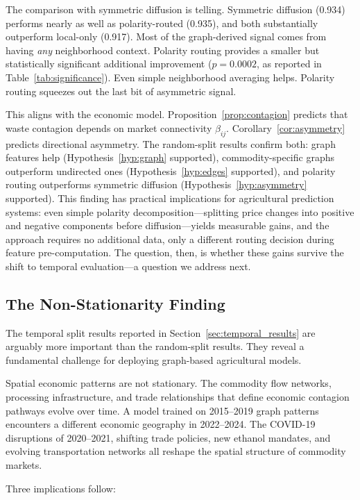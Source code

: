 \documentclass[preprint,12pt,authoryear]{elsarticle}
\begin{document}
The comparison with symmetric diffusion is telling. Symmetric diffusion (0.934) performs nearly as well as polarity-routed (0.935), and both substantially outperform local-only (0.917). Most of the graph-derived signal comes from having \emph{any} neighborhood context. Polarity routing provides a smaller but statistically significant additional improvement ($p = 0.0002$, as reported in Table~\ref{tab:significance}). Even simple neighborhood averaging helps. Polarity routing squeezes out the last bit of asymmetric signal.

This aligns with the economic model. Proposition~\ref{prop:contagion} predicts that waste contagion depends on market connectivity $\beta_{ij}$. Corollary~\ref{cor:asymmetry} predicts directional asymmetry. The random-split results confirm both: graph features help (Hypothesis~\ref{hyp:graph} supported), commodity-specific graphs outperform undirected ones (Hypothesis~\ref{hyp:edges} supported), and polarity routing outperforms symmetric diffusion (Hypothesis~\ref{hyp:asymmetry} supported). This finding has practical implications for agricultural prediction systems: even simple polarity decomposition---splitting price changes into positive and negative components before diffusion---yields measurable gains, and the approach requires no additional data, only a different routing decision during feature pre-computation. The question, then, is whether these gains survive the shift to temporal evaluation---a question we address next.

\subsection{The Non-Stationarity Finding}

The temporal split results reported in Section~\ref{sec:temporal_results} are arguably more important than the random-split results. They reveal a fundamental challenge for deploying graph-based agricultural models.

Spatial economic patterns are not stationary. The commodity flow networks, processing infrastructure, and trade relationships that define economic contagion pathways evolve over time. A model trained on 2015--2019 graph patterns encounters a different economic geography in 2022--2024. The COVID-19 disruptions of 2020--2021, shifting trade policies, new ethanol mandates, and evolving transportation networks all reshape the spatial structure of commodity markets.

Three implications follow:
\end{document}

